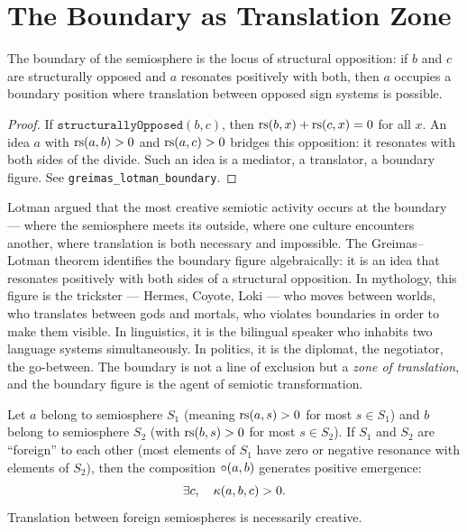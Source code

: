 \section{The Boundary as Translation Zone}

\begin{theorem}
\label{thm:greimas-lotman}
The boundary of the semiosphere is the locus of structural opposition:
if $b$ and $c$ are structurally opposed and $a$ resonates positively
with both, then $a$ occupies a boundary position where translation
between opposed sign systems is possible.
\end{theorem}

\begin{proof}
If $\texttt{structurallyOpposed}(b, c)$, then $\mathrm{rs}(b, x) + \mathrm{rs}(c, x)
= 0$ for all $x$. An idea $a$ with $\mathrm{rs}(a, b) > 0$ and $\mathrm{rs}(a, c) > 0$
bridges this opposition: it resonates with both sides of the divide.
Such an idea is a mediator, a translator, a boundary figure. See
\texttt{greimas\_lotman\_boundary}.
\end{proof}

\begin{interpretation}
Lotman argued that the most creative semiotic activity occurs at the
boundary --- where the semiosphere meets its outside, where one
culture encounters another, where translation is both necessary and
impossible. The Greimas--Lotman theorem identifies the boundary figure
algebraically: it is an idea that resonates positively with both sides
of a structural opposition. In mythology, this figure is the trickster
--- Hermes, Coyote, Loki --- who moves between worlds, who translates
between gods and mortals, who violates boundaries in order to make them
visible. In linguistics, it is the bilingual speaker who inhabits two
language systems simultaneously. In politics, it is the diplomat, the
negotiator, the go-between. The boundary is not a line of exclusion
but a \emph{zone of translation}, and the boundary figure is the agent
of semiotic transformation.
\end{interpretation}

\begin{theorem}
\label{thm:translation-emergence}
Let $a$ belong to semiosphere $S_1$ (meaning $\mathrm{rs}(a, s) > 0$ for most $s \in S_1$) and $b$ belong to semiosphere $S_2$ (with $\mathrm{rs}(b, s) > 0$ for most $s \in S_2$). If $S_1$ and $S_2$ are ``foreign'' to each other (most elements of $S_1$ have zero or negative resonance with elements of $S_2$), then the composition $\circ(a, b)$ generates positive emergence:
\[
  \exists c, \quad \kappa(a, b, c) > 0.
\]
Translation between foreign semiospheres is necessarily creative.
\end{theorem}

